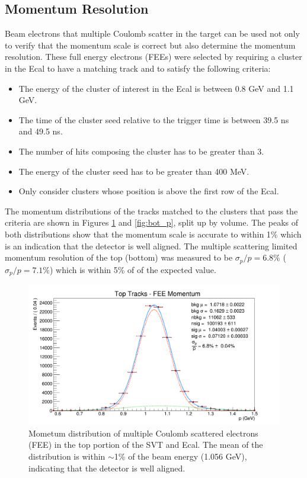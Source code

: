 \subsection{Momentum Resolution}

Beam electrons that multiple Coulomb scatter in the target can be used  
not only to verify that the momentum scale is correct but also determine the 
momentum resolution.  These full energy electrons (FEEs) 
were selected by requiring a cluster in the Ecal to have a matching track and
to satisfy the following criteria:
\begin{itemize}
    \item The energy of the cluster of interest in the Ecal  is between 0.8 GeV
          and 1.1 GeV.
    \item The time of the cluster seed relative to the trigger time is between
          39.5 ns and 49.5 ns.
    \item The number of hits composing the cluster has to be greater than 3.
    \item The energy of the cluster seed has to be greater than 400 MeV.
    \item Only consider clusters whose position is above the first row of the 
          Ecal.
\end{itemize}
The momentum distributions of the tracks matched to the clusters that pass the
criteria are shown in Figures \ref{fig:top_p} and \ref{fig:bot_p}, split up by volume.  The peaks
of both distributions show that the momentum scale is accurate to within 1\% 
which is an indication that the detector is well aligned.  The 
multiple scattering limited momentum resolution of the top (bottom) was measured
to be $\sigma_{p}/p = 6.8\%$ ($\sigma_{p}/p = 7.1\%$) which 
is within 5\% of of the expected value.
\begin{figure}[h!t]
    \centering
    \includegraphics[width=.95\textwidth]{images/20160424_fee_top_tracks_p.png}
    \caption{Mometum distribution of multiple Coulomb scattered electrons (FEE) in
             the top portion of the SVT and Ecal. 
             The mean of the distribution 
             is within $\sim$1\% of the beam energy (1.056 GeV), indicating that 
             the detector is well aligned.}
    \label{fig:top_p}
\end{figure}
